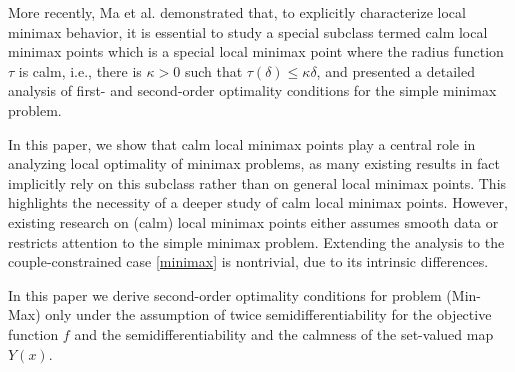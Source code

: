 \documentclass[11pt]{article}
\numberwithin{equation}{section}
\begin{document}
More recently, Ma et al. \cite{Ma2023}  demonstrated that, to explicitly characterize local minimax behavior, it is essential to study a special subclass termed calm local minimax points which is a special local minimax point where   the radius function $\tau$  is calm, i.e., there is $\kappa>0 $ such that $\tau(\delta)\leq \kappa \delta$,
 and presented a detailed analysis of first- and second-order optimality conditions for the   simple minimax problem.



In this paper, we show that calm local minimax points play a central role in analyzing local optimality of minimax problems, as many existing results in fact implicitly rely on this subclass rather than on general local minimax points. This highlights the necessity of a deeper study of calm local minimax points. However, existing research on (calm) local minimax points either assumes smooth data or restricts attention to the simple minimax problem. Extending the analysis to the couple-constrained case \eqref{minimax} is nontrivial, due to its intrinsic differences. 

In this paper we derive second-order optimality conditions for problem (Min-Max) only under the assumption of {twice  semidifferentiability} for the objective function $f$ and the semidifferentiability {and the calmness} of the set-valued map $Y(x)$. 
\end{document}
